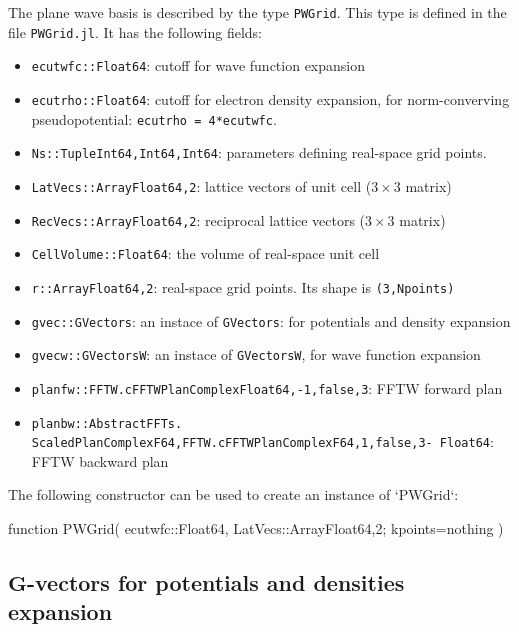 \documentclass[a4paper,10pt]{paper}
\newcommand{\jlcode}[1]{\texttt{#1}}
\begin{document}
The plane wave basis is described by the type \jlcode{PWGrid}.
This type is defined in the file \jlcode{PWGrid.jl}. It has the following fields:
\begin{itemize}
%
\item \jlcode{ecutwfc::Float64}: cutoff for wave function expansion
%
\item \jlcode{ecutrho::Float64}: cutoff for electron density expansion, for norm-converving
  pseudopotential: \jlcode{ecutrho = 4*ecutwfc}.
%
\item \jlcode{Ns::Tuple{Int64,Int64,Int64}}: parameters defining real-space grid points.
%
\item \jlcode{LatVecs::Array{Float64,2}}: lattice vectors of unit cell ($3\times3$ matrix)
%
\item \jlcode{RecVecs::Array{Float64,2}}: reciprocal lattice vectors ($3\times3$ matrix)
%
\item \jlcode{CellVolume::Float64}: the volume of real-space unit cell
%
\item \jlcode{r::Array{Float64,2}}: real-space grid points.
  Its shape is \jlcode{(3,Npoints)}
%
\item \jlcode{gvec::GVectors}: an instace of \jlcode{GVectors}:
  for potentials and density expansion
%
\item \jlcode{gvecw::GVectorsW}: an instace of \jlcode{GVectorsW}, for wave function expansion
%
\item \jlcode{planfw::FFTW.cFFTWPlan{Complex{Float64},-1,false,3}}: FFTW forward plan
%
\item \jlcode{planbw::AbstractFFTs.}\\
      \jlcode{ScaledPlan{ComplexF64,FFTW.cFFTWPlan{ComplexF64,1,false,3- Float64}}}: FFTW backward plan
%
\end{itemize}

The following constructor can be used to create an instance of `PWGrid`:

\begin{juliacode}
function PWGrid( ecutwfc::Float64,
                 LatVecs::Array{Float64,2};
                 kpoints=nothing )
\end{juliacode}


\subsection{$\mathbf{G}$-vectors for potentials and densities expansion}
\end{document}
